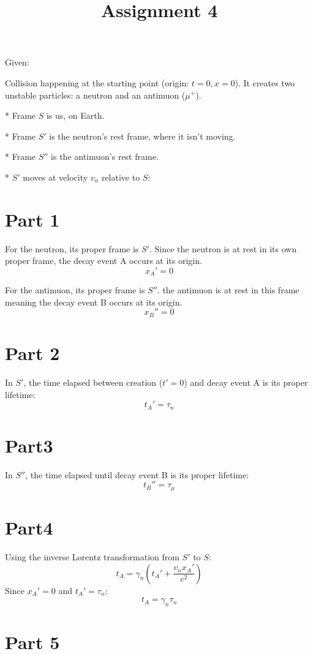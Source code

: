\documentclass{article}
\title{Assignment 4}
\begin{document}
\setlength{\parindent}{0pt}
\maketitle

Given:

Collision happening at the starting point (origin: $t=0, x=0$). It creates two unstable particles: a neutron and an antimuon ($\mu^+$).  

* Frame $S$ is us, on Earth.  

* Frame $S'$ is the neutron's rest frame, where it isn't moving. 

* Frame $S''$ is the antimuon's rest frame.  

* $S'$ moves at velocity $v_n$ relative to $S$:


\section{Part 1}

For the neutron, its proper frame is $S'$. Since the neutron is at rest in its own proper frame, the decay event A occurs at its origin.
$$x_A' = 0$$

For the antimuon, its proper frame is $S''$. the antimuon is at rest in this frame meaning the decay event B occurs at its origin.
$$x_B'' = 0$$

\section{Part 2}
In $S'$, the time elapsed between creation ($t'=0$) and decay event A is its proper lifetime:
$$t_A' = \tau_n$$

\section{Part3}

In $S''$, the time elapsed until decay event B is its proper lifetime:
$$t_B'' = \tau_\mu$$

\section{Part4}

Using the inverse Lorentz transformation from $S'$ to $S$:
$$t_A = \gamma_n (t_A' + \frac{v_n x_A'}{c^2})$$
Since $x_A' = 0$ and $t_A' = \tau_n$:
$$t_A = \gamma_n \tau_n$$

\section{Part 5}
\end{document}
